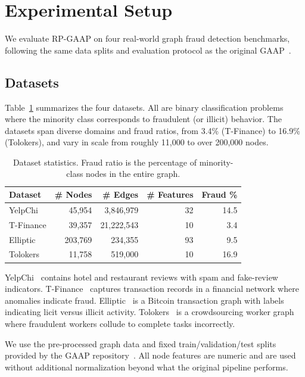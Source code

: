 \section{Experimental Setup}
\label{sec:experiment_setups}

We evaluate RP-GAAP on four real-world graph fraud detection benchmarks, following the same data splits and evaluation protocol as the original GAAP~\cite{duan2025global}.

\subsection{Datasets}

Table~\ref{tab:datasets} summarizes the four datasets. All are binary classification problems where the minority class corresponds to fraudulent (or illicit) behavior. The datasets span diverse domains and fraud ratios, from 3.4\% (T-Finance) to 16.9\% (Tolokers), and vary in scale from roughly 11,000 to over 200,000 nodes.

\begin{table}[h]
\centering
\caption{Dataset statistics. Fraud ratio is the percentage of minority-class nodes in the entire graph.}
\label{tab:datasets}
\begin{tabular}{lrrrr}
\toprule
Dataset & \# Nodes & \# Edges & \# Features & Fraud \% \\
\midrule
YelpChi     & 45,954  & 3,846,979 & 32  & 14.5 \\
T-Finance   & 39,357  & 21,222,543 & 10 & 3.4 \\
Elliptic    & 203,769 & 234,355   & 93  & 9.5 \\
Tolokers    & 11,758  & 519,000   & 10  & 16.9 \\
\bottomrule
\end{tabular}
\end{table}

YelpChi~\cite{rayana2015collective} contains hotel and restaurant reviews with spam and fake-review indicators. T-Finance~\cite{tang2023gadbench} captures transaction records in a financial network where anomalies indicate fraud. Elliptic~\cite{weber2019anti} is a Bitcoin transaction graph with labels indicating licit versus illicit activity. Tolokers~\cite{tang2023gadbench} is a crowdsourcing worker graph where fraudulent workers collude to complete tasks incorrectly.

We use the pre-processed graph data and fixed train/validation/test splits provided by the GAAP repository~\cite{duan2025global}. All node features are numeric and are used without additional normalization beyond what the original pipeline performs.

